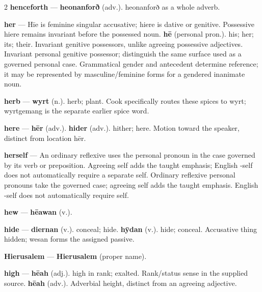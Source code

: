 \begin{multicols}{2}
\textbf{henceforth} — \textbf{heonanforð} (adv.). heonanforð as a whole adverb.\par
\textbf{her} — Hīe is feminine singular accusative; hiere is dative or genitive. Possessive hiere remains invariant before the possessed noun. \textbf{hē} (personal pron.). his; her; its; their. Invariant genitive possessors, unlike agreeing possessive adjectives. Invariant personal genitive possessor; distinguish the same surface used as a governed personal case. Grammatical gender and antecedent determine reference; it may be represented by masculine/feminine forms for a gendered inanimate noun.\par
\textbf{herb} — \textbf{wyrt} (n.). herb; plant. Cook specifically routes these spices to wyrt; wyrtgemang is the separate earlier spice word.\par
\textbf{here} — \textbf{hēr} (adv.).  \textbf{hider} (adv.). hither; here. Motion toward the speaker, distinct from location hēr.\par
\textbf{herself} — An ordinary reflexive uses the personal pronoun in the case governed by its verb or preposition. Agreeing self adds the taught emphasis; English -self does not automatically require a separate self. Ordinary reflexive personal pronouns take the governed case; agreeing self adds the taught emphasis. English -self does not automatically require self.\par
\textbf{hew} — \textbf{hēawan} (v.).\par
\textbf{hide} — \textbf{diernan} (v.). conceal; hide. \textbf{hȳdan} (v.). hide; conceal. Accusative thing hidden; wesan forms the assigned passive.\par
\textbf{Hierusalem} — \textbf{Hierusalem} (proper name).\par
\textbf{high} — \textbf{hēah} (adj.). high in rank; exalted. Rank/status sense in the supplied source. \textbf{hēah} (adv.). Adverbial height, distinct from an agreeing adjective.\par

\end{multicols}

